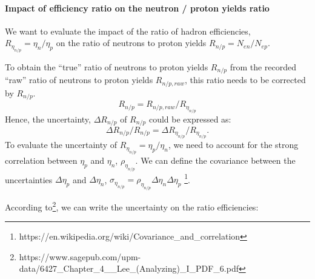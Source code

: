 \paragraph{Impact of efficiency ratio on the neutron / proton yields ratio}

{\hskip 0.7cm}We want to evaluate the impact of the ratio of hadron efficiencies,\\
$R_{\eta_{n/p}} = \eta_n/\eta_p$
on the ratio of neutrons to proton yields $R_{n/p} = N_{en}/N_{ep}$.

To obtain the ``true'' ratio of neutrons to proton yields $R_{n/p}$ from the recorded ``raw''
ratio of neutrons to proton yields $R_{n/p, raw}$,
this ratio needs to be corrected by $R_{n/p}$.
%
\begin{equation}
  R_{n/p} = R_{n/p, raw}/R_{\eta_{n/p}}
\end{equation}
%
Hence, the uncertainty, $\Delta R_{n/p}$ of $R_{n/p}$ could be expressed as:
%
\begin{equation}
  \Delta R_{n/p}/R_{n/p} = \Delta R_{\eta_{n/p}}/R_{\eta_{n/p}}.
\end{equation}
%
To evaluate the uncertainty of $R_{\eta_{n/p}} = \eta_p/\eta_n$,
we need to account for the strong correlation between $\eta_p$ and $\eta_n$, $\rho_{\eta_{n/p}}$. 
We can define the covariance between the uncertainties $\Delta \eta_p$ and $\Delta \eta_n$,
$\sigma_{\eta_{n/p}} = \rho_{\eta_{n/p}} \Delta \eta_{n} \Delta \eta_{p}$ \footnote{https://en.wikipedia.org/wiki/Covariance\_and\_correlation}.

According to\footnote{https://www.sagepub.com/upm-data/6427\_Chapter\_4\_\_Lee\_(Analyzing)\_I\_PDF\_6.pdf}, we can write the uncertainty on the ratio efficiencies:

